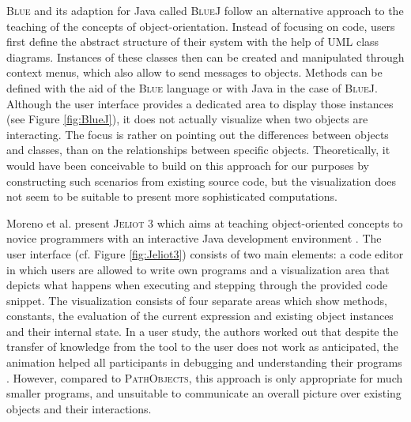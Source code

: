 \textsc{Blue} \cite{kolling_object-oriented_1996, kolling_blue_1996} and its adaption for Java called \textsc{BlueJ} \cite{kolling_bluej_2003} follow an alternative approach to the teaching of the concepts of object-orientation.
Instead of focusing on code, users first define the abstract structure of their system with the help of UML class diagrams.
Instances of these classes then can be created and manipulated through  context menus, which also allow to send messages to objects.
Methods can be defined with the aid of the \textsc{Blue} language or with Java in the case of \textsc{BlueJ}.
Although the user interface provides a dedicated area to display those instances (see Figure \ref{fig:BlueJ}), it does not actually visualize when two objects are interacting.
The focus is rather on pointing out the differences  between objects and classes, than on the relationships between specific objects.
Theoretically, it would have been conceivable to build on this approach for our purposes by constructing such scenarios from existing source code, but the visualization does not seem to be suitable to present more sophisticated computations.

Moreno et al. present \textsc{Jeliot 3} which aims at teaching object-oriented concepts to novice programmers with an interactive Java development environment \cite{moreno_visualizing_2004, bednarik_jeliot_2005}.
The user interface (cf. Figure \ref{fig:Jeliot3}) consists of two main elements: a code editor in which users are allowed to write own programs and a visualization area that depicts what happens when executing and stepping through the provided code snippet.
The visualization consists of four separate areas which show methods, constants, the evaluation of the current expression and existing object instances and their internal state.
In a user study, the authors worked out that despite the transfer of knowledge from the tool to the user does not work as anticipated, the animation helped all participants in debugging and understanding their programs \cite{moreno_jeliot_2007}.
However, compared to \textsc{PathObjects}, this approach is only appropriate for much smaller programs, and unsuitable to communicate an overall picture over existing objects and their interactions.